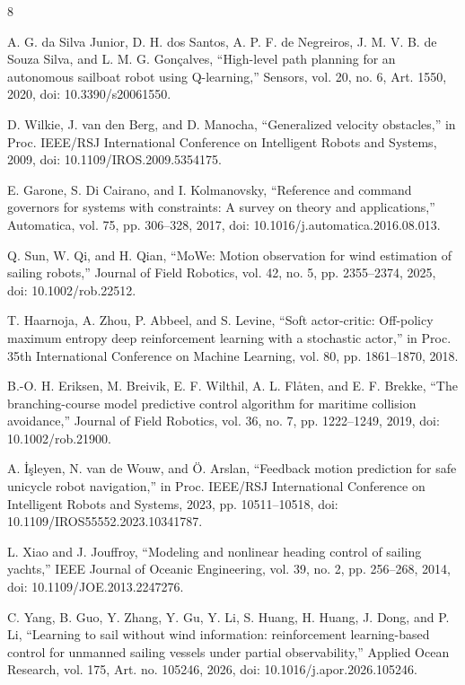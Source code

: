 \documentclass[conference]{IEEEtran}
\begin{document}
\begin{thebibliography}{8}

 A. G. da Silva Junior, D. H. dos Santos, A. P. F. de Negreiros, J. M. V. B. de Souza Silva, and L. M. G. Gon\c{c}alves, ``High-level path planning for an autonomous sailboat robot using Q-learning,'' Sensors, vol. 20, no. 6, Art. 1550, 2020, doi: 10.3390/s20061550.

 D. Wilkie, J. van den Berg, and D. Manocha, ``Generalized velocity obstacles,'' in Proc. IEEE/RSJ International Conference on Intelligent Robots and Systems, 2009, doi: 10.1109/IROS.2009.5354175.

 E. Garone, S. Di Cairano, and I. Kolmanovsky, ``Reference and command governors for systems with constraints: A survey on theory and applications,'' Automatica, vol. 75, pp. 306--328, 2017, doi: 10.1016/j.automatica.2016.08.013.

 Q. Sun, W. Qi, and H. Qian, ``MoWe: Motion observation for wind estimation of sailing robots,'' Journal of Field Robotics, vol. 42, no. 5, pp. 2355--2374, 2025, doi: 10.1002/rob.22512.

 T. Haarnoja, A. Zhou, P. Abbeel, and S. Levine, ``Soft actor-critic: Off-policy maximum entropy deep reinforcement learning with a stochastic actor,'' in Proc. 35th International Conference on Machine Learning, vol. 80, pp. 1861--1870, 2018.

 B.-O. H. Eriksen, M. Breivik, E. F. Wilthil, A. L. Fl\aa{}ten, and E. F. Brekke, ``The branching-course model predictive control algorithm for maritime collision avoidance,'' Journal of Field Robotics, vol. 36, no. 7, pp. 1222--1249, 2019, doi: 10.1002/rob.21900.

 A. \.{I}\c{s}leyen, N. van de Wouw, and \"{O}. Arslan, ``Feedback motion prediction for safe unicycle robot navigation,'' in Proc. IEEE/RSJ International Conference on Intelligent Robots and Systems, 2023, pp. 10511--10518, doi: 10.1109/IROS55552.2023.10341787.

 L. Xiao and J. Jouffroy, ``Modeling and nonlinear heading control of sailing yachts,'' IEEE Journal of Oceanic Engineering, vol. 39, no. 2, pp. 256--268, 2014, doi: 10.1109/JOE.2013.2247276.

 C. Yang, B. Guo, Y. Zhang, Y. Gu, Y. Li, S. Huang, H. Huang, J. Dong, and P. Li, ``Learning to sail without wind information: reinforcement learning-based control for unmanned sailing vessels under partial observability,'' Applied Ocean Research, vol. 175, Art. no. 105246, 2026, doi: 10.1016/j.apor.2026.105246.

\end{thebibliography}
\end{document}
